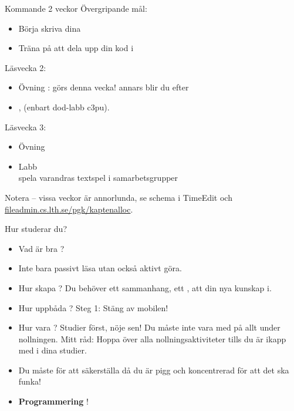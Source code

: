 \begin{SlideExtra}{Kommande 2 veckor}
Övergripande mål:
\begin{itemize}
\item Börja skriva dina 
\item Träna på att dela upp din kod i 
\end{itemize}

Läsvecka 2:
\begin{itemize}
\item Övning \texttt{\ExeWeekTWO}: görs denna vecka! annars blir du efter 
\item {}, (enbart dod-labb c3pu).
\end{itemize}
Läsvecka 3:
\begin{itemize}
\item Övning \texttt{\ExeWeekTHREE}
\item Labb \texttt{\LabWeekTHREE}  \\ spela varandras textspel i samarbetsgrupper
\end{itemize}

\vspace{0.5em} Notera  -- vissa veckor är annorlunda, se schema i TimeEdit och \href{https://fileadmin.cs.lth.se/pgk/kaptenalloc}{fileadmin.cs.lth.se/pgk/kaptenalloc}.\\

\end{SlideExtra}




\begin{SlideExtra}{Hur studerar du?}
\begin{itemize}
\item Vad är bra ?
\item {} Inte bara passivt läsa utan också aktivt göra.
\item Hur skapa ?
Du behöver ett sammanhang, ett , att  din nya kunskap i.
\item Hur uppbåda ? Steg 1: Stäng av mobilen!
\item Hur vara ? Studier först, nöje sen! Du måste inte vara med på allt under nollningen. Mitt råd: Hoppa över alla nollningsaktiviteter tills du är ikapp med i dina studier.
\item Du måste  för att säkerställa  då du är pigg och koncentrerad för att det ska funka!
\item \textbf{Programmering}  !
\end{itemize}
\end{SlideExtra}


